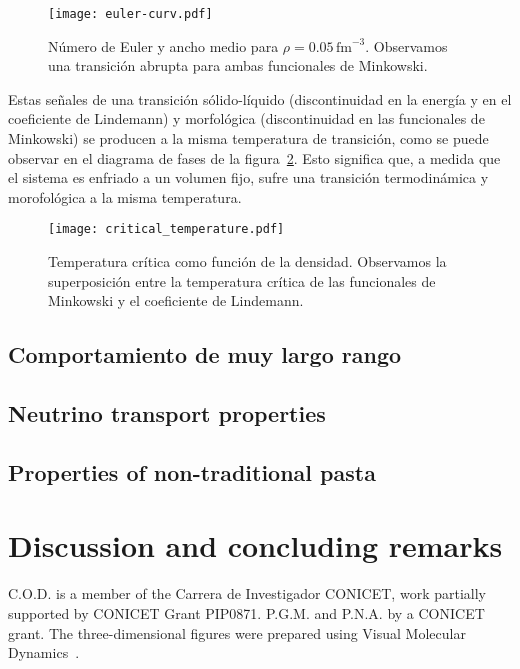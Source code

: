 \documentclass[twocolumn,showpacs]{revtex4-1}
\begin{document}
\begin{figure}%
  \centering \texttt{[image: euler-curv.pdf]}
  \caption{Número de Euler y ancho medio para $\rho=0.05\,\text{fm}^{-3}$.
    Observamos una transición abrupta para ambas funcionales de Minkowski.}
  \label{fig:euler-curv}
\end{figure}

Estas señales de una transición sólido-líquido (discontinuidad en la energía y en el coeficiente de Lindemann) y morfológica (discontinuidad en las funcionales de Minkowski) se producen a la misma temperatura de transición, como se puede observar en el diagrama de fases de la figura~\ref{fig:critical_temperature}.
Esto significa que, a medida que el sistema es enfriado a un volumen fijo, sufre una transición termodinámica y morofológica a la misma temperatura.

\begin{figure}[floatfix]  \centering
  \texttt{[image: critical\_temperature.pdf]}
  \caption{Temperatura crítica como función de la densidad.
    Observamos la superposición entre la temperatura crítica de las funcionales de Minkowski y el coeficiente de Lindemann.}
  \label{fig:critical_temperature}
\end{figure}


\subsection{Comportamiento de muy largo rango}
  \label{very_long}
  

\subsection{Neutrino transport properties}
  \label{transport}
  

\subsection{Properties of non-traditional pasta}
  \label{unusual_pasta}
  

\section{Discussion and concluding remarks}
  \label{discussion}
  

\begin{acknowledgments}
  C.O.D. is a member of the Carrera de Investigador CONICET, work
  partially supported by CONICET Grant PIP0871. P.G.M. and P.N.A.  by
  a CONICET grant. The three-dimensional figures were prepared using
  Visual Molecular Dynamics~\cite{VMD}.
\end{acknowledgments}

\begin{thebibliography}{99}
  
\end{thebibliography}
\end{document}
